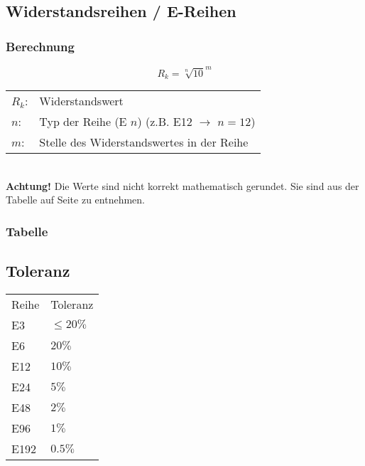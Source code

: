 



\subsection{Widerstandsreihen / E-Reihen}
\subsubsection{Berechnung}
\[ R_k = {\sqrt[n]{10}}^m \]
\begin{tabular}{@{}ll}
$R_k$: & Widerstandswert \\
$n$:   & Typ der Reihe (E $n$) (z.B. E12 $\rightarrow$ $n=12$) \\
$m$:   & Stelle des Widerstandswertes in der Reihe \\
\end{tabular} \\
\textbf{Achtung!} Die Werte sind nicht korrekt mathematisch gerundet. Sie sind 
aus der Tabelle auf Seite \pageref{subsubsec:ereihe_tab} zu entnehmen. 

\subsubsection{Tabelle}
\label{subsubsec:ereihe_tab}


\subsection{Toleranz}
\begin{tabular}{ll}
Reihe & Toleranz \\
E3   & $\leq20\%$ \\
E6   & $20\%$ \\
E12  & $10\%$ \\
E24  & $5\%$ \\
E48  & $2\%$ \\
E96  & $1\%$ \\
E192 & $0.5\%$ \\
\end{tabular}
